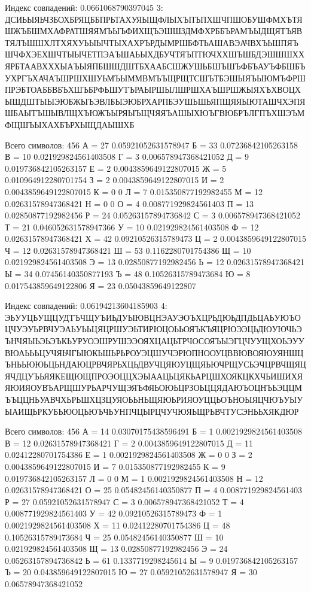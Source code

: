 \documentclass[a4paper, 14pt]{extarticle}
\begin{document}
Индекс совпадений: 0.0661068790397045
3: ДСИЬЫЯЬЧЗБОХБРЯЦББПРЬТАХУЯЫЩФЛЫХЪПЪПХШЧПШОБУШФМХЪТЯШЖЪБШМХАФРАТШЯЯМЪЫЪФИХЩЪЭШШЗДМФХРББЪРАМЪЫДЩЯТЪЯВТЯЛЪШШХЛТХЯХУЬЫЫЧТЫХАХРЪРДЫМРШБФТЬАШАВЭАЧВХЪЬШПЯЪШЧФХЭЕХШЧТЫЫЧЕТПЭАЪШАЬЫХДБУЧТЯЪПТЮЧХХШЪШБДЭШШШХХЯРБТААВХХХЫАЪЫЯПБШШДШТБХААБСШЖУШЬБШЪШЪФБЪАУЪФБШБЪУХРГЪХАЧАЪШРШХШУЬМЪЫММВМЪЪЩРЩТСШЪТБЭШЫЯЪЫЮМЪФРШПРЭБТОАББВБЪХШЪБРФЬШУТЪРАЫРШЫЛШРШХАЪШРШЖЫЯХЪХВОЦХЫШДШТЫЫЭЮБЖЫЪЭВЛБЫЭЮБРХАРПБЭУШЬШЬЯПЩЯЯЫЮТАШЧХЭПЯШБАЫТЪШЫВЛЩХЪЮЖЪЫРЯЫЪЩЧЯЯЪАШЫХЮЪГВЮБРЪЛГПЪХШЭЪМФЩШЪЫХАХБЪРХЫЩДАЫШХБ

Всего символов: 456
А = 27
0.05921052631578947
Б = 33
0.07236842105263158
В = 10
0.021929824561403508
Г = 3
0.006578947368421052
Д = 9
0.019736842105263157
Е = 2
0.0043859649122807015
Ж = 5
0.010964912280701754
З = 2
0.0043859649122807015
И = 2
0.0043859649122807015
К = 0
0
Л = 7
0.015350877192982455
М = 12
0.02631578947368421
Н = 0
0
О = 4
0.008771929824561403
П = 13
0.02850877192982456
Р = 24
0.05263157894736842
С = 3
0.006578947368421052
Т = 21
0.046052631578947366
У = 10
0.021929824561403508
Ф = 12
0.02631578947368421
Х = 42
0.09210526315789473
Ц = 2
0.0043859649122807015
Ч = 12
0.02631578947368421
Ш = 53
0.1162280701754386
Щ = 10
0.021929824561403508
Э = 13
0.02850877192982456
Ь = 12
0.02631578947368421
Ы = 34
0.07456140350877193
Ъ = 48
0.10526315789473684
Ю = 8
0.017543859649122806
Я = 23
0.05043859649122807

Индекс совпадений: 0.06194213604185903
4: ЭЬУУЦЬУЩЦУДТЪЧЩУЪИЬДУЫЮВЦНЭАУЭОЪХЦРЬДЮЬДПДЬЦАЬУЮЪОЦЧУЭУЬРВЧУЭАЬУЬЬЦЯЦРШУЭЬТИРЮЦОЬЬОЯЪКЪЯЦРЮЭЭЦЬДЮУЮЧЬЭЪНЧЯЫЬЭЬЭЪКЬУРУОЭШРУШЭЭОЯХЦАЦЬТРЧОСОЯЪЫЭГЦЧУУЩХОЬЭУУВЮАЬЬЬЦУЧЯЬЧГЫЮКЬШЬРЬРОУЭЦШУЧЭРЮПНООУЦВВЮВОЯЮУЯНШЦЪНЬЬЮЮЬЦЬНДАЮЦРВЧЯРЬХЦЬДВУЧЦЯЮУЦЩЯЬЮЧРЩУСЬЭЧЦРВЧЩЯЦЯЧДЦУЪЬЯЯКЕЩЮЩПРОЭОЦЦХЭЫААЦЬЦЯКЬАРЦШХОЯКЦКХЧЬИШИХЯЯЮИЯОУВЪАРЩШУРЬАРЧУЩЭЯЪФЯЬОЮЬЦРЗОЬЦЦЯДАЮЪОЦНЪЬЭЦЦМЪЪЦЦНЬУАВЧХЬРЬШХЦЗЦУЯОЬЬНЬЩЯЮЬРИЯОУЦЦЬОЪНОЫЯЦЧЮЪУЫУЫАИЩЬРКУБЬЮОЦЬЮЪЧЬУНПЧЦЫРЦЧУЧЮЯЬЩРЬВЧТУСЭНЬЬХЯКДЮР

Всего символов: 456
А = 14
0.03070175438596491
Б = 1
0.0021929824561403508
В = 12
0.02631578947368421
Г = 2
0.0043859649122807015
Д = 11
0.02412280701754386
Е = 1
0.0021929824561403508
Ж = 0
0
З = 2
0.0043859649122807015
И = 7
0.015350877192982455
К = 9
0.019736842105263157
Л = 0
0
М = 1
0.0021929824561403508
Н = 12
0.02631578947368421
О = 25
0.05482456140350877
П = 4
0.008771929824561403
Р = 27
0.05921052631578947
С = 3
0.006578947368421052
Т = 4
0.008771929824561403
У = 42
0.09210526315789473
Ф = 1
0.0021929824561403508
Х = 11
0.02412280701754386
Ц = 48
0.10526315789473684
Ч = 25
0.05482456140350877
Ш = 10
0.021929824561403508
Щ = 13
0.02850877192982456
Э = 24
0.05263157894736842
Ь = 61
0.1337719298245614
Ы = 9
0.019736842105263157
Ъ = 20
0.043859649122807015
Ю = 27
0.05921052631578947
Я = 30
0.06578947368421052
\end{document}
